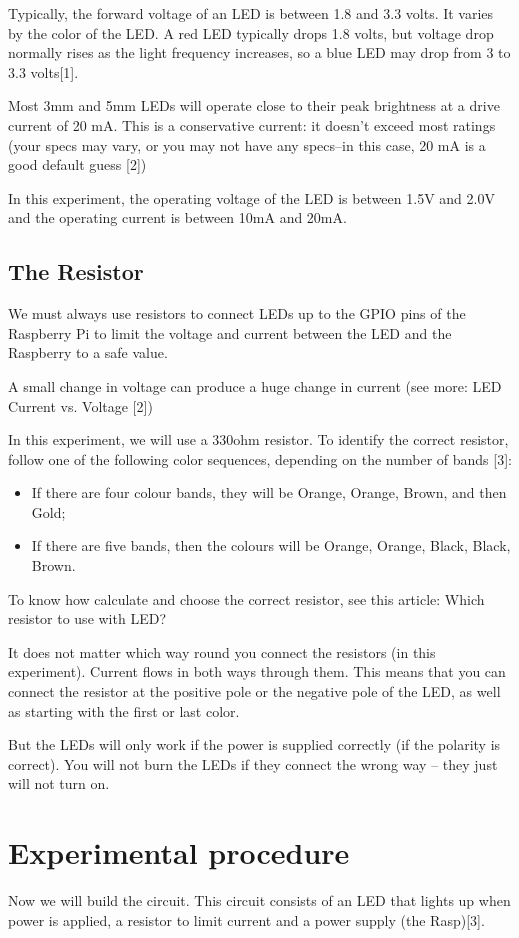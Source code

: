 \documentclass[10pt,twoside,english]{_support/latex/sbabook/sbabook}
\begin{document}
Typically, the forward voltage of an LED is between 1.8 and 3.3 volts. It varies by the color of the LED. A red LED typically drops 1.8 volts, but voltage drop normally rises as the light frequency increases, so a blue LED may drop from 3 to 3.3 volts{[}1{]}.

Most 3mm and 5mm LEDs will operate close to their peak brightness at a drive current of 20 mA. This is a conservative current: it doesn’t exceed most ratings (your specs may vary, or you may not have any specs–in this case, 20 mA is a good default guess {[}2{]})

In this experiment, the operating voltage of the LED is between 1.5V and 2.0V and the operating current is between 10mA and 20mA.
\subsection{The Resistor}
We must always use resistors to connect LEDs up to the GPIO pins of the Raspberry Pi to limit the voltage and current between the LED and the Raspberry to a safe value.

A small change in voltage can produce a huge change in current (see more: LED Current vs. Voltage {[}2{]})

In this experiment, we will use a 330ohm resistor. To identify the correct resistor, follow one of the following color sequences, depending on the number of bands {[}3{]}:

\begin{itemize}
\item If there are four colour bands, they will be Orange, Orange, Brown, and then Gold;
\item If there are five bands, then the colours will be Orange, Orange, Black, Black, Brown.
\end{itemize}

To know how calculate and choose the correct resistor, see this article: Which resistor to use with LED?

It does not matter which way round you connect the resistors (in this experiment). Current flows in both ways through them. This means that you can connect the resistor at the positive pole or the negative pole of the LED, as well as starting with the first or last color.

But the LEDs will only work if the power is supplied correctly (if the polarity is correct). You will not burn the LEDs if they connect the wrong way – they just will not turn on.
\section{Experimental procedure}
Now we will build the circuit. This circuit consists of an LED that lights up when power is applied, a resistor to limit current and a power supply (the Rasp){[}3{]}.
\end{document}
